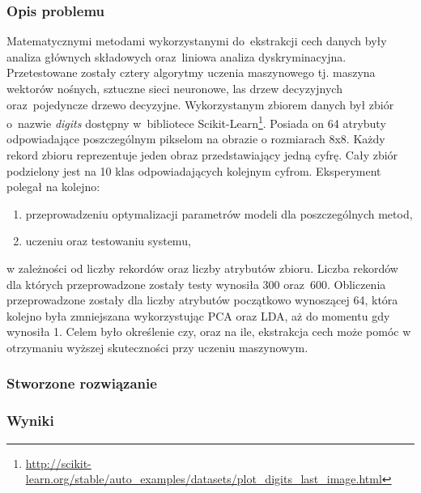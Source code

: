 \subsubsection{Opis problemu}
Matematycznymi metodami wykorzystanymi do~ekstrakcji cech danych były analiza głównych składowych oraz~liniowa analiza dyskryminacyjna. Przetestowane zostały cztery algorytmy uczenia maszynowego tj. maszyna wektorów nośnych, sztuczne sieci neuronowe, las drzew decyzyjnych oraz~pojedyncze drzewo decyzyjne. Wykorzystanym zbiorem danych był zbiór o~nazwie \textit{digits} dostępny w~bibliotece Scikit-Learn\footnote{\url{http://scikit-learn.org/stable/auto_examples/datasets/plot_digits_last_image.html}}. Posiada on 64 atrybuty odpowiadające poszczególnym pikselom na obrazie o rozmiarach 8x8. Każdy rekord zbioru reprezentuje jeden obraz przedstawiający jedną cyfrę. Cały zbiór podzielony jest na 10 klas odpowiadających kolejnym cyfrom. Eksperyment polegał na kolejno:
\begin{enumerate}
\item przeprowadzeniu optymalizacji parametrów modeli dla poszczególnych metod,
\item uczeniu oraz testowaniu systemu,
\end{enumerate}
w zależności od liczby rekordów oraz liczby atrybutów zbioru. Liczba rekordów dla których przeprowadzone zostały testy wynosiła 300 oraz~600. Obliczenia przeprowadzone zostały dla liczby atrybutów początkowo wynoszącej 64, która kolejno była zmniejszana wykorzystując PCA oraz LDA, aż do momentu gdy wynosiła 1. Celem było określenie czy, oraz na ile, ekstrakcja cech może pomóc w otrzymaniu wyższej skuteczności przy uczeniu maszynowym.

\subsubsection{Stworzone rozwiązanie}
\subsubsection{Wyniki}

\newcommand{\fesize}{0.45}

